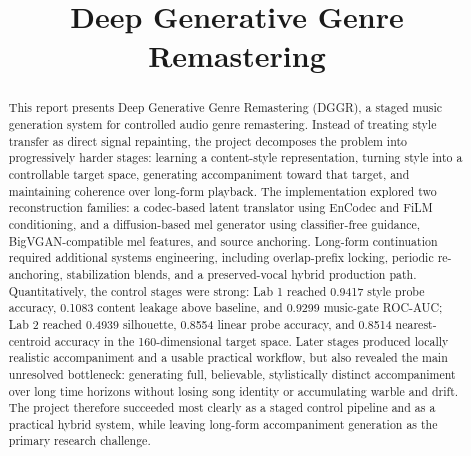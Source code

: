 \documentclass[conference]{IEEEtran}
\begin{document}
\title{Deep Generative Genre Remastering}

\author{
\and
{}
\and
{}
}

\maketitle

\begin{abstract}
This report presents Deep Generative Genre Remastering (DGGR), a staged music generation system for controlled audio genre remastering. Instead of treating style transfer as direct signal repainting, the project decomposes the problem into progressively harder stages: learning a content-style representation, turning style into a controllable target space, generating accompaniment toward that target, and maintaining coherence over long-form playback. The implementation explored two reconstruction families: a codec-based latent translator using EnCodec and FiLM conditioning, and a diffusion-based mel generator using classifier-free guidance, BigVGAN-compatible mel features, and source anchoring. Long-form continuation required additional systems engineering, including overlap-prefix locking, periodic re-anchoring, stabilization blends, and a preserved-vocal hybrid production path. Quantitatively, the control stages were strong: Lab 1 reached 0.9417 style probe accuracy, 0.1083 content leakage above baseline, and 0.9299 music-gate ROC-AUC; Lab 2 reached 0.4939 silhouette, 0.8554 linear probe accuracy, and 0.8514 nearest-centroid accuracy in the 160-dimensional target space. Later stages produced locally realistic accompaniment and a usable practical workflow, but also revealed the main unresolved bottleneck: generating full, believable, stylistically distinct accompaniment over long time horizons without losing song identity or accumulating warble and drift. The project therefore succeeded most clearly as a staged control pipeline and as a practical hybrid system, while leaving long-form accompaniment generation as the primary research challenge.
\end{abstract}
\end{document}
